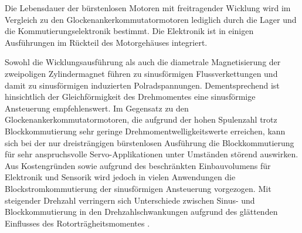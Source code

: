 Die Lebensdauer der bürstenlosen Motoren mit freitragender Wicklung wird im Vergleich zu den Glockenankerkommutatormotoren lediglich durch die Lager und die Kommutierungselektronik bestimmt. Die Elektronik ist in einigen Ausführungen im Rückteil des Motorgehäuses integriert.

Sowohl die Wicklungsausführung als auch die diametrale Magnetisierung der zweipoligen Zylindermagnet führen zu sinusförmigen Flussverkettungen und damit zu sinusförmigen induzierten Polradspannungen. Dementsprechend ist hinsichtlich der Gleichförmigkeit des Drehmomentes eine sinusförmige Ansteuerung empfehlenswert. Im Gegensatz zu den Glockenankerkommutatormotoren, die aufgrund der hohen Spulenzahl trotz Blockkommutierung sehr geringe Drehmomentwelligkeitswerte erreichen, kann sich bei der nur dreisträngigen bürstenlosen Ausführung die Blockkommutierung für sehr anspruchsvolle Servo-Applikationen unter Umständen störend auswirken. Aus Kostengründen sowie aufgrund des beschränkten Einbauvolumens für Elektronik und Sensorik wird jedoch in vielen Anwendungen die Blockstromkommutierung der sinusförmigen Ansteuerung vorgezogen. Mit steigender Drehzahl verringern sich Unterschiede zwischen Sinus- und Blockkommutierung in den Drehzahlschwankungen aufgrund des glättenden Einflusses des Rotorträgheitsmomentes \parencite[S.  78]{Stölting2011}.


